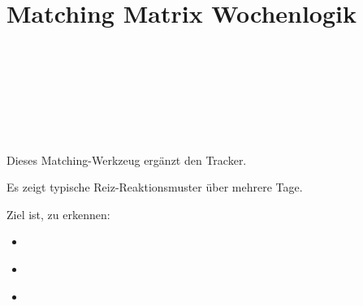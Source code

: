 
\section{Matching Matrix Wochenlogik}
\label{sec:matching-matrix-wochenlogik}

\hypertarget{matching---matrix-wochenlogik}{%
\section[ 🧩 \ul{\textbf{\textcolor{ctmmBlue}{\1}}}]{\texorpdfstring{\protect\hypertarget{X96f1e2678408cb7c5ef4392def4268f775f9a0d}{}{} 🧩 \ul{\textbf{\textcolor{ctmmBlue}{\1}}}}{ 🧩 MATCHING - MATRIX -- WOCHENLOGIK:}}\label{matching---matrix-wochenlogik}}

\hypertarget{trigger-reaktion-hilfe}{%
\section{\texorpdfstring{\ul{\textbf{\textcolor{ctmmBlue}{\1}}} \ul{\textbf{\textcolor{ctmmBlue}{\1}}} \ul{\textbf{\textcolor{ctmmBlue}{\1}}} \ul{\textbf{\textcolor{ctmmBlue}{\1}}} \ul{\textbf{\textcolor{ctmmBlue}{\1}}}}{TRIGGER ↔ REAKTION ↔ HILFE}}\label{trigger-reaktion-hilfe}}

\hypertarget{ctmm-modul}{%
\section{\texorpdfstring{\ul{\textbf{\textcolor{ctmmBlue}{\1}}}}{(CTMM-MODUL)}}\label{ctmm-modul}}

\hfill\break
\hfill\break

🧠 \textbf{\textcolor{ctmmBlue}{\1}}

\hfill\break
Dieses Matching-Werkzeug ergänzt den Tracker.

Es zeigt typische Reiz-Reaktionsmuster über mehrere Tage.

Ziel ist, zu erkennen:

\begin{itemize}[label=\textcolor{ctmmOrange}{\faArrowRight}]
\item
  \textbf{\textcolor{ctmmBlue}{\1}}
\item
  \textbf{\textcolor{ctmmBlue}{\1}}
\item
  \textbf{\textcolor{ctmmBlue}{\1}}
\end{itemize}

